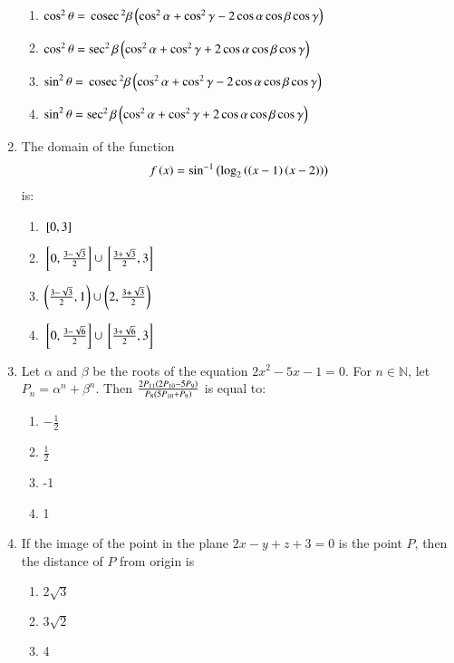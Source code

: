 \documentclass[journal]{IEEEtran}
\begin{document}
\begin{enumerate}
 \begin{enumerate}
     \item $\cos^2\theta = \,\text{cosec}\,^2\beta\left(\cos^2\alpha + \cos^2\gamma - 2\cos\alpha\cos\beta\cos\gamma\right)$
     \item $\cos^2\theta = \sec^2\beta\left(\cos^2\alpha + \cos^2\gamma + 2\cos\alpha\cos\beta\cos\gamma\right)$
     \item $\sin^2\theta = \,\text{cosec}\,^2\beta\left(\cos^2\alpha + \cos^2\gamma - 2\cos\alpha\cos\beta\cos\gamma\right)$
     \item $\sin^2\theta = \sec^2\beta\left(\cos^2\alpha + \cos^2\gamma + 2\cos\alpha\cos\beta\cos\gamma\right)$ \\
 \end{enumerate}
\item The domain of the function
\begin{align*}
    f\left(x\right) = \sin^{-1}\left(\log_2\left(\left(x-1\right)\left(x-2\right)\right)\right)
\end{align*}
is:
\begin{enumerate}
     \item ${}\left[0, 3\right]$
     \item ${}\left[0, \frac{3-\sqrt{3}}{2}\right]\cup{}\left[\frac{3+\sqrt{3}}{2}, 3\right]$
     \item $\left(\frac{3-\sqrt{3}}{2}, 1\right)\cup\left(2, \frac{3+\sqrt{3}}{2}\right)$
     \item ${}\left[0, \frac{3-\sqrt{6}}{2}\right]\cup{}\left[\frac{3+\sqrt{6}}{2}, 3\right]$ \\
 \end{enumerate}
\item Let $\alpha$ and $\beta$ be the roots of the equation $2x^2 - 5x - 1 = 0$. For $n\in\mathbb{N}$, let $P_n = \alpha^n + \beta^n$. Then $\frac{2P_{11}\left(2P_{10}-5P_9\right)}{P_8\left(5P_{10}+P_9\right)}$ is equal to:
\begin{enumerate}
    \item $-\frac{1}{2}$
    \item $\frac{1}{2}$
    \item -1
    \item 1\\
\end{enumerate}
\item If the image of the point  in the plane $2x - y + z + 3 = 0$ is the point $P$, then the distance of $P$ from origin is
\begin{enumerate}
    \item $2\sqrt{3}$
    \item $3\sqrt{2}$
    \item 4

\end{enumerate}
\end{enumerate}
\end{document}
